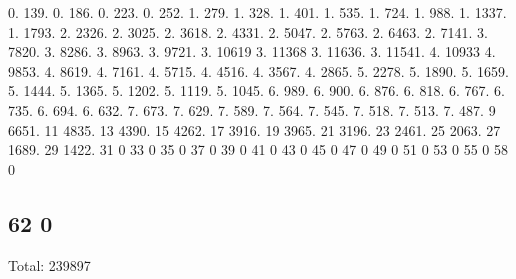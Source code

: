 0. 139. 0. 186. 0. 223. 0. 252. 1. 279. 1. 328. 1. 401. 1. 535. 1. 724. 1. 988. 1. 1337. 1. 1793. 2. 2326. 2. 3025. 2. 3618. 2. 4331. 2. 5047. 2. 5763. 2. 6463. 2. 7141. 3. 7820. 3. 8286. 3. 8963. 3. 9721. 3. 10619 3. 11368 3. 11636. 3. 11541. 4. 10933 4. 9853. 4. 8619. 4. 7161. 4. 5715. 4. 4516. 4. 3567. 4. 2865. 5. 2278. 5. 1890. 5. 1659. 5. 1444. 5. 1365. 5. 1202. 5. 1119. 5. 1045. 6. 989. 6. 900. 6. 876. 6. 818. 6. 767. 6. 735. 6. 694. 6. 632. 7. 673. 7. 629. 7. 589. 7. 564. 7. 545. 7. 518. 7. 513. 7. 487. 9 6651. 11 4835. 13 4390. 15 4262. 17 3916. 19 3965. 21 3196. 23 2461. 25 2063. 27 1689. 29 1422. 31 0 33 0 35 0 37 0 39 0 41 0 43 0 45 0 47 0 49 0 51 0 53 0 55 0 58 0 \subsection*{62 0 }

Total\+: 239897 